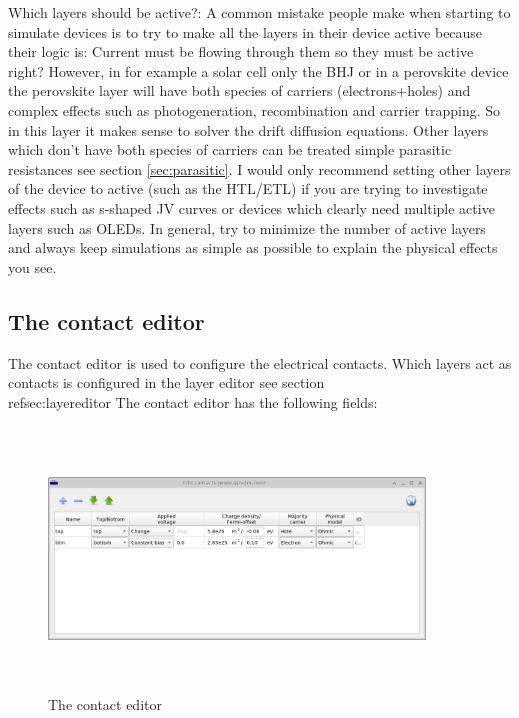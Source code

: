 Which layers should be active?: A common mistake people make when starting to simulate devices is to try to make all the layers in their device active because their logic is: Current must be flowing through them so they must be active right?  However, in for example a solar cell only the BHJ or in a perovskite device the perovskite layer will have both species of carriers (electrons+holes) and complex effects such as photogeneration, recombination and carrier trapping. So in this layer it makes sense to solver the drift diffusion equations.  Other layers which don't have both species of carriers can be treated simple parasitic resistances see section \ref{sec:parasitic}. I would only recommend setting other layers of the device to active (such as the HTL/ETL) if you are trying to investigate effects such as s-shaped JV curves or devices which clearly need multiple active layers such as OLEDs. In general, try to minimize the number of active layers and always keep simulations as simple as possible to explain the physical effects you see.  

\subsection{The contact editor}
\label{sec:contacteditor}
The contact editor is used to configure the electrical contacts.  Which layers act as contacts is configured in the layer editor see section \\ref{sec:layereditor}  The contact editor has the following fields:

\begin{figure}[H]
\centering
\includegraphics[width=100mm,height=70mm]{./images/contact_editor.png}
\caption{The contact editor}
\label{fig:contacteditor}
\end{figure}

